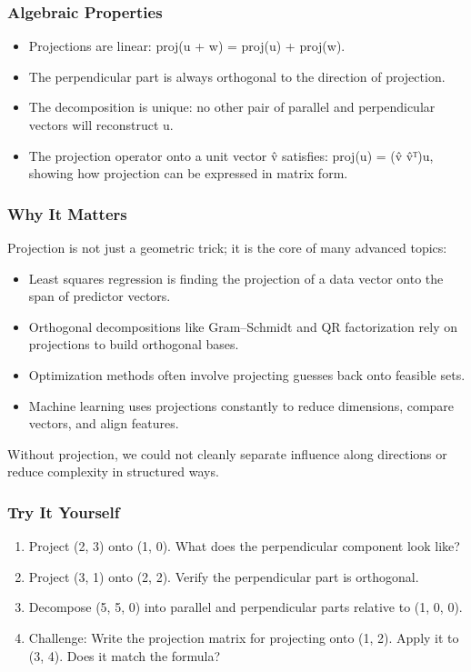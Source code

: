\documentclass[
  letterpaper,
  DIV=11,
  numbers=noendperiod]{scrreprt}
\providecommand{\tightlist}{%
  \setlength{\itemsep}{0pt}\setlength{\parskip}{0pt}}
\begin{document}
\subsubsection{Algebraic Properties}\label{algebraic-properties-4}

\begin{itemize}
\tightlist
\item
  Projections are linear: proj(u + w) = proj(u) + proj(w).
\item
  The perpendicular part is always orthogonal to the direction of
  projection.
\item
  The decomposition is unique: no other pair of parallel and
  perpendicular vectors will reconstruct u.
\item
  The projection operator onto a unit vector v̂ satisfies: proj(u) = (v̂
  v̂ᵀ)u, showing how projection can be expressed in matrix form.
\end{itemize}

\subsubsection{Why It Matters}\label{why-it-matters-7}

Projection is not just a geometric trick; it is the core of many
advanced topics:

\begin{itemize}
\tightlist
\item
  Least squares regression is finding the projection of a data vector
  onto the span of predictor vectors.
\item
  Orthogonal decompositions like Gram--Schmidt and QR factorization rely
  on projections to build orthogonal bases.
\item
  Optimization methods often involve projecting guesses back onto
  feasible sets.
\item
  Machine learning uses projections constantly to reduce dimensions,
  compare vectors, and align features.
\end{itemize}

Without projection, we could not cleanly separate influence along
directions or reduce complexity in structured ways.

\subsubsection{Try It Yourself}\label{try-it-yourself-7}

\begin{enumerate}
\def\labelenumi{\arabic{enumi}.}
\tightlist
\item
  Project (2, 3) onto (1, 0). What does the perpendicular component look
  like?
\item
  Project (3, 1) onto (2, 2). Verify the perpendicular part is
  orthogonal.
\item
  Decompose (5, 5, 0) into parallel and perpendicular parts relative to
  (1, 0, 0).
\item
  Challenge: Write the projection matrix for projecting onto (1, 2).
  Apply it to (3, 4). Does it match the formula?
\end{enumerate}
\end{document}
